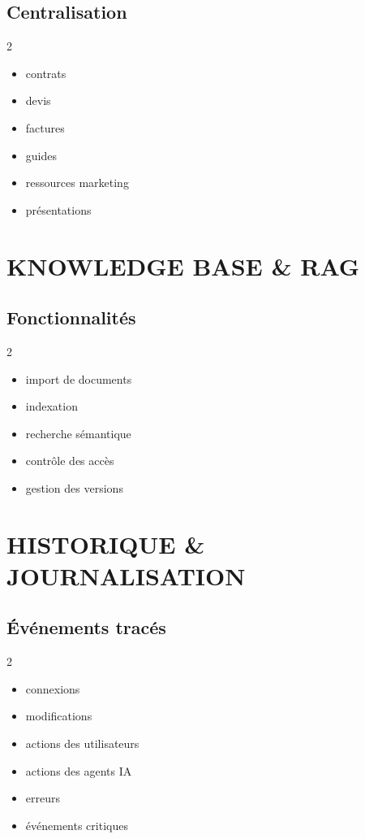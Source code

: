 \documentclass[12pt,a4paper,oneside]{book}
\begin{document}
\section{Centralisation}
\begin{multicols}{2}
\begin{itemize}
\item contrats
\item devis
\item factures
\item guides
\item ressources marketing
\item présentations
\end{itemize}
\end{multicols}

\chapter{KNOWLEDGE BASE \& RAG}

\section{Fonctionnalités}
\begin{multicols}{2}
\begin{itemize}
\item import de documents
\item indexation
\item recherche sémantique
\item contrôle des accès
\item gestion des versions
\end{itemize}
\end{multicols}

\chapter{HISTORIQUE \& JOURNALISATION}

\section{Événements tracés}
\begin{multicols}{2}
\begin{itemize}
\item connexions
\item modifications
\item actions des utilisateurs
\item actions des agents IA
\item erreurs
\item événements critiques
\end{itemize}
\end{multicols}
\end{document}
